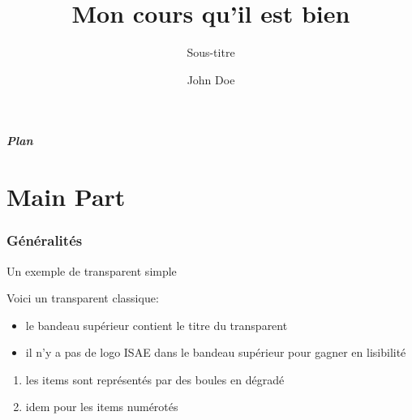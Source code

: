 \documentclass{beamer}
\begin{document}
\title[Petit titre]{Mon cours qu'il est bien}
\subtitle{Sous-titre}
\author{John Doe}
\subject{Slides to present my beamer class for ISAE slides.}
\date{}

\begin{frame}
  \titlepage
\end{frame}

\begin{frame}
\frametitle{Plan}
\tableofcontents[part=1,pausesections]
\end{frame}


\part<presentation>{Main Part}

\section{Généralités}
\label{sec:gen}

\begin{frame}{Un exemple de transparent simple}

\vfill

Voici un transparent classique:

\begin{itemize}
\item le bandeau supérieur contient le titre du transparent
\item il n'y a pas de logo ISAE dans le bandeau supérieur pour gagner
  en lisibilité
\end{itemize}

\begin{enumerate}
\item les items sont représentés par des boules en dégradé
\item idem pour les items numérotés
\end{enumerate}

\vfill

\end{frame}
\end{document}
